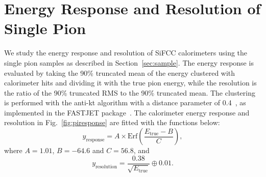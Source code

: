 \documentclass{PoS}
\begin{document}
\section{Energy Response and Resolution of Single Pion}
We study the energy response and resolution of SiFCC calorimeters using the 
single pion samples as described in Section~\ref{sec:sample}. The energy 
response is evaluated by taking the 90\% truncated mean of the energy 
clustered with calorimeter hits and dividing it with the true pion energy, 
while the resolution is the ratio of the 90\% truncated RMS to 
the 90\% truncated mean. 
The clustering is performed with the anti-kt algorithm with a distance 
parameter of 0.4~\cite{Cacciari:2008gp}, as implemented in the \textsc{FASTJET}
package~\cite{fastjet}. The calorimeter energy response and resolution in 
Fig.~\ref{fig:piresponse} are fitted with the functions below:
\begin{equation}
 y_\mathrm{response} = A \times \mathrm{Erf}\left(\frac{E_\mathrm{true}-B}{C}\right),
\label{eq:response}
\end{equation}
where $A=1.01$, $B=-64.6$ and $C=56.8$, and 
\begin{equation}
 y_\mathrm{resolution} = \frac{0.38}{\sqrt{E_\mathrm{true}}} \oplus 0.01.
\label{eq:resolution}
\end{equation}
\end{document}
